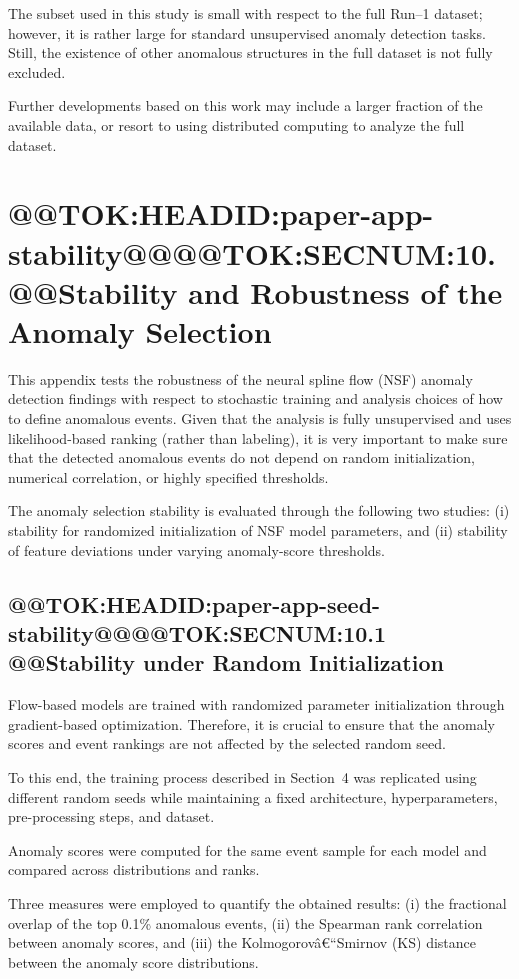 \documentclass[11pt]{article}
\begin{document}
The subset used in this study is small with respect to the full Run--1 dataset; however, it is rather large for standard unsupervised anomaly detection tasks.
Still, the existence of other anomalous structures in the full dataset is not fully excluded.

Further developments based on this work may include a larger fraction of the available data, or resort to using distributed computing to analyze the full dataset.
\section{@@TOK:HEADID:paper-app-stability@@@@TOK:SECNUM:10. @@Stability and Robustness of the Anomaly Selection}

This appendix tests the robustness of the neural spline flow (NSF) anomaly detection findings with respect to stochastic training and analysis choices of how to define anomalous events.
Given that the analysis is fully unsupervised and uses likelihood-based ranking (rather than labeling), it is very important to make sure that the detected anomalous events do not depend on random initialization, numerical correlation, or highly specified thresholds.

The anomaly selection stability is evaluated through the following two studies: 
(i) stability for randomized initialization of NSF model parameters, and 
(ii) stability of feature deviations under varying anomaly-score thresholds. 

\subsection{@@TOK:HEADID:paper-app-seed-stability@@@@TOK:SECNUM:10.1 @@Stability under Random Initialization}

Flow-based models are trained with randomized parameter initialization through gradient-based optimization. 
Therefore, it is crucial to ensure that the anomaly scores and event rankings are not affected by the selected random seed.

To this end, the training process described in Section~4 was replicated using different random seeds while maintaining a fixed architecture, hyperparameters, pre-processing steps, and dataset.

Anomaly scores were computed for the same event sample for each model and compared across distributions and ranks.

Three measures were employed to quantify the obtained results:
(i) the fractional overlap of the top 0.1\% anomalous events,
(ii) the Spearman rank correlation between anomaly scores, and
(iii) the Kolmogorovâ€“Smirnov (KS) distance between the anomaly score distributions.
\end{document}

